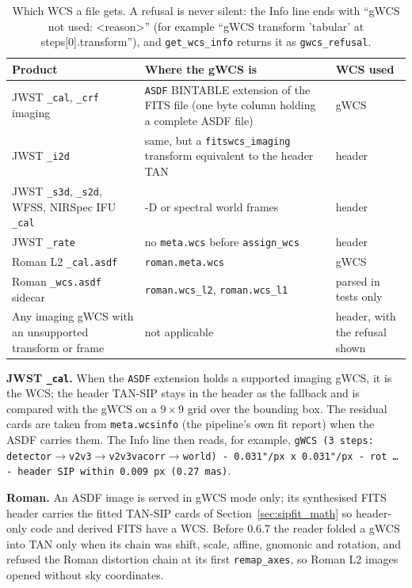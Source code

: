 \documentclass[11pt,a4paper]{article}
\newcommand{\code}[1]{\texttt{\small #1}}
\begin{document}
    \begin{table}[H]
        \centering
        \small
        \begin{tabularx}{\textwidth}{>{\raggedright\arraybackslash}p{4.4cm}>{\raggedright\arraybackslash}X>{\raggedright\arraybackslash}p{2.9cm}}
            \toprule
            \textbf{Product} & \textbf{Where the gWCS is} & \textbf{WCS used} \\
            \midrule
            JWST \code{\_cal}, \code{\_crf} imaging & \code{ASDF} BINTABLE extension of the FITS file (one byte column holding a complete ASDF file) & gWCS \\
            JWST \code{\_i2d} & same, but a \code{fitswcs\_imaging} transform equivalent to the header TAN & header \\
            JWST \code{\_s3d}, \code{\_s2d}, WFSS, NIRSpec IFU \code{\_cal} & 3-D or spectral world frames & header \\
            JWST \code{\_rate} & no \code{meta.wcs} before \code{assign\_wcs} & header \\
            Roman L2 \code{\_cal.asdf} & \code{roman.meta.wcs} & gWCS \\
            Roman \code{\_wcs.asdf} sidecar & \code{roman.wcs\_l2}, \code{roman.wcs\_l1} & parsed in tests only \\
            Any imaging gWCS with an unsupported transform or frame & not applicable & header, with the refusal shown \\
            \bottomrule
        \end{tabularx}
        \caption{Which WCS a file gets. A refusal is never silent: the Info line ends with ``gWCS not used: \textless reason\textgreater'' (for example ``gWCS transform 'tabular' at steps[0].transform''), and \code{get\_wcs\_info} returns it as \code{gwcs\_refusal}.}
    \end{table}

    \textbf{JWST \code{\_cal}.} When the \code{ASDF} extension holds a supported imaging gWCS, it is the WCS; the header TAN-SIP stays in the header as the fallback and is compared with the gWCS on a $9 \times 9$ grid over the bounding box. The residual cards are taken from \code{meta.wcsinfo} (the pipeline's own fit report) when the ASDF carries them. The Info line then reads, for example, \code{gWCS (3 steps: detector}$\to$\code{v2v3}$\to$\code{v2v3vacorr}$\to$\code{world) - 0.031"/px x 0.031"/px - rot \ldots{} - header SIP within 0.009 px (0.27 mas)}.

    \textbf{Roman.} An ASDF image is served in gWCS mode only; its synthesised FITS header carries the fitted TAN-SIP cards of Section~\ref{sec:sipfit_math} so header-only code and derived FITS have a WCS. Before 0.6.7 the reader folded a gWCS into TAN only when its chain was shift, scale, affine, gnomonic and rotation, and refused the Roman distortion chain at its first \code{remap\_axes}, so Roman L2 images opened without sky coordinates.
\end{document}
